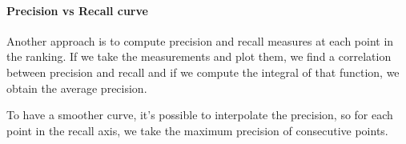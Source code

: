 \paragraph{Precision vs Recall curve}
Another approach is to compute precision and recall measures at each point in the ranking.
If we take the measurements and plot them, we find a correlation between precision 
and recall and if we compute the integral of that function, we obtain the average precision.

To have a smoother curve, it's possible to interpolate the precision, so for each 
point in the recall axis, we take the maximum precision of consecutive points.